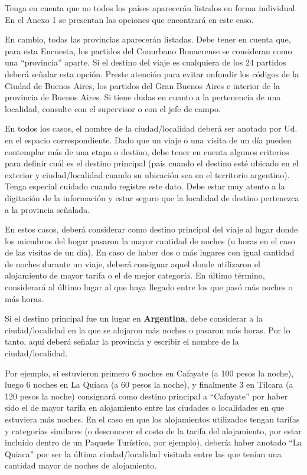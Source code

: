 \documentclass[
  openany]{book}
\begin{document}
Tenga en cuenta que no todos los países aparecerán listados en forma individual. En el Anexo 1 se presentan las opciones que encontrará en este caso.

En cambio, todas las provincias aparecerán listadas. Debe tener en cuenta que, para esta Encuesta, los partidos del Conurbano Bonaerense se consideran como una ``provincia'' aparte. Si el destino del viaje es cualquiera de los 24 partidos deberá señalar esta opción. Preste atención para evitar onfundir los códigos de la Ciudad de Buenos Aires, los partidos del Gran Buenos Aires e interior de la provincia de Buenos Aires. Si tiene dudas en cuanto a la pertenencia de una localidad, consulte con el supervisor o con el jefe de campo.

En todos los casos, el nombre de la ciudad/localidad deberá ser anotado por Ud. en el espacio correspondiente. Dado que un viaje o una visita de un día pueden contemplar más de una etapa o destino, debe tener en cuenta algunos criterios para definir cuál es el destino principal (país cuando el destino esté ubicado en el exterior y ciudad/localidad cuando su ubicación sea en el territorio argentino). Tenga especial cuidado cuando registre este dato. Debe estar muy atento a la digitación de la información y estar seguro que la localidad de destino pertenezca a la provincia señalada.

En estos casos, deberá considerar como destino principal del viaje al lugar donde los miembros del hogar pasaron la mayor cantidad de noches (u horas en el caso de las visitas de un día). En caso de haber dos o más lugares con igual cantidad de noches durante un viaje, deberá consignar aquel donde utilizaron el alojamiento de mayor tarifa o el de mejor categoría. En último término, considerará al último lugar al que haya llegado entre los que pasó más noches o más horas.

Si el destino principal fue un lugar en \textbf{Argentina}, debe considerar a la ciudad/localidad en la que se alojaron más noches o pasaron más horas. Por lo tanto, aquí deberá señalar la provincia y escribir el nombre de la ciudad/localidad.

Por ejemplo, si estuvieron primero 6 noches en Cafayate (a 100 pesos la noche), luego 6 noches en La Quiaca (a 60 pesos la noche), y finalmente 3 en Tilcara (a 120 pesos la noche) consignará como destino principal a ``Cafayate'' por haber sido el de mayor tarifa en alojamiento entre las ciudades o localidades en que estuviera más noches. En el caso en que los alojamientos utilizados tengan tarifas y categorías similares (o desconocer el costo de la tarifa del alojamiento, por estar incluido dentro de un Paquete Turístico, por ejemplo), debería haber anotado ``La Quiaca'' por ser la última ciudad/localidad visitada entre las que tenían una cantidad mayor de noches de alojamiento.
\end{document}
